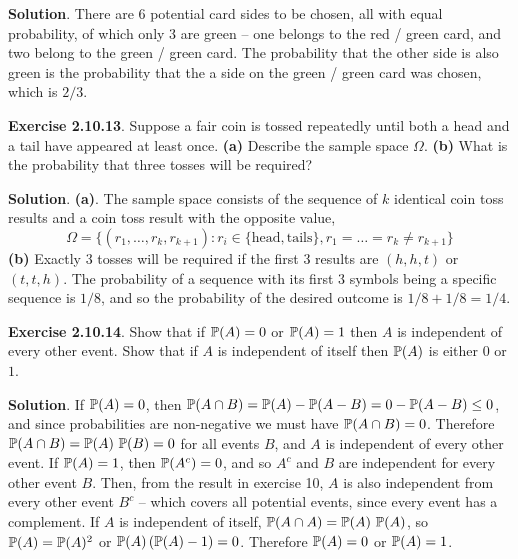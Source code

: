 \textbf{Solution}. There are 6 potential card sides to be chosen, all
with equal probability, of which only 3 are green -- one belongs to the
red / green card, and two belong to the green / green card. The
probability that the other side is also green is the probability that
the a side on the green / green card was chosen, which is $2/3$.

\textbf{Exercise 2.10.13}. Suppose a fair coin is tossed repeatedly
until both a head and a tail have appeared at least once.
\textbf{(a)} Describe the sample space \(\Omega\).
\textbf{(b)} What is the probability that three tosses will be required?

\textbf{Solution}.
\textbf{(a)}. The sample space consists of the sequence of \(k\)
identical coin toss results and a coin toss result with the opposite
value,
\[
\Omega = \{ (r_{1}, \dots, r_{k}, r_{k+1}) : r_{i} \in \{ \text{head}, \text{tails} \}, r_{1} = \dots = r_{k} \neq r_{k + 1} \}
\]
\textbf{(b)} Exactly 3 tosses will be required if the first 3 results
are \((h, h, t)\) or \((t, t, h)\).
The probability of a sequence with its first $3$ symbols being a specific 
sequence is $1/8$, and so the probability of the desired outcome is 
$1/8 + 1/8 = 1/4$.

\textbf{Exercise 2.10.14}. Show that if \(\operatorname{\mathbb{P}}(A) = 0\) or \(\operatorname{\mathbb{P}}(A) = 1\) then \(A\) is independent of every other event. Show that if \(A\) is independent of itself then \(\operatorname{\mathbb{P}}(A)\) is either $0$ or $1$.

\textbf{Solution}.
If \(\operatorname{\mathbb{P}}(A) = 0\), then \(\operatorname{\mathbb{P}}(A \cap B) = \operatorname{\mathbb{P}}(A) - \operatorname{\mathbb{P}}(A - B) = 0 -\operatorname{\mathbb{P}}(A - B) \leq 0\), and since probabilities are non-negative we must have \(\operatorname{\mathbb{P}}(A \cap B) = 0\). Therefore \(\operatorname{\mathbb{P}}(A \cap B) = \operatorname{\mathbb{P}}(A) \, \operatorname{\mathbb{P}}(B) = 0\) for all events \(B\), and \(A\) is independent of every other event.
If \(\operatorname{\mathbb{P}}(A) = 1\), then \(\operatorname{\mathbb{P}}(A^{c}) = 0\), and so \(A^{c}\) and \(B\) are independent for every other event \(B\). Then, from the result in exercise 10, \(A\) is also independent from every other event \(B^{c}\) -- which covers all potential events, since every event has a complement.
If \(A\) is independent of itself, \(\operatorname{\mathbb{P}}(A \cap A) = \operatorname{\mathbb{P}}(A) \, \operatorname{\mathbb{P}}(A)\), so \(\operatorname{\mathbb{P}}(A) = \operatorname{\mathbb{P}}(A)^{2}\) or \(\operatorname{\mathbb{P}}(A) \, ( \operatorname{\mathbb{P}}(A) - 1 ) = 0\). Therefore \(\operatorname{\mathbb{P}}(A) = 0\) or \(\operatorname{\mathbb{P}}(A) = 1\).

